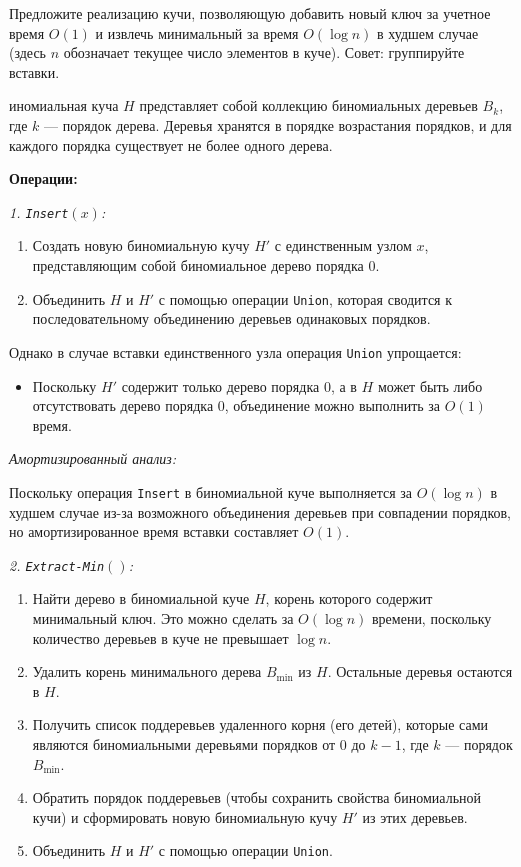 \documentclass[11pt]{article}
\begin{document}
\begin{problem}{25}
Предложите реализацию кучи, позволяющую добавить новый ключ за учетное время $O(1)$ и извлечь минимальный за время $O(\log n)$ в худшем случае
(здесь $n$ обозначает текущее число элементов в куче).
Совет: группируйте вставки.
\end{problem}

\begin{solution}
    иномиальная куча $H$ представляет собой коллекцию биномиальных деревьев $B_k$, где $k$ — порядок дерева. Деревья хранятся в порядке возрастания порядков, и для каждого порядка существует не более одного дерева.

    \textbf{Операции:}

    \textit{1. \texttt{Insert}$(x)$:}

    \begin{enumerate}
        \item Создать новую биномиальную кучу $H'$ с единственным узлом $x$, представляющим собой биномиальное дерево порядка $0$.
        \item Объединить $H$ и $H'$ с помощью операции \texttt{Union}, которая сводится к последовательному объединению деревьев одинаковых порядков.
    \end{enumerate}

    Однако в случае вставки единственного узла операция \texttt{Union} упрощается:

    \begin{itemize}
        \item Поскольку $H'$ содержит только дерево порядка $0$, а в $H$ может быть либо отсутствовать дерево порядка $0$, объединение можно выполнить за $O(1)$ время.
    \end{itemize}

    \textit{Амортизированный анализ:}

    Поскольку операция \texttt{Insert} в биномиальной куче выполняется за $O(\log n)$ в худшем случае из-за возможного объединения деревьев при совпадении порядков, но амортизированное время вставки составляет $O(1)$.

    \textit{2. \texttt{Extract-Min}$()$:}

    \begin{enumerate}
        \item Найти дерево в биномиальной куче $H$, корень которого содержит минимальный ключ. Это можно сделать за $O(\log n)$ времени, поскольку количество деревьев в куче не превышает $\log n$.
        \item Удалить корень минимального дерева $B_{\text{min}}$ из $H$. Остальные деревья остаются в $H$.
        \item Получить список поддеревьев удаленного корня (его детей), которые сами являются биномиальными деревьями порядков от $0$ до $k-1$, где $k$ — порядок $B_{\text{min}}$.
        \item Обратить порядок поддеревьев (чтобы сохранить свойства биномиальной кучи) и сформировать новую биномиальную кучу $H'$ из этих деревьев.
        \item Объединить $H$ и $H'$ с помощью операции \texttt{Union}.
    \end{enumerate}


\end{solution}
\end{document}
